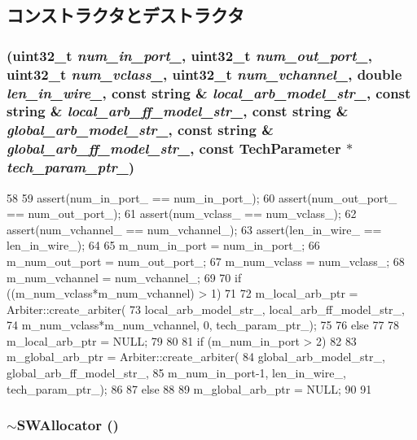 \subsection{コンストラクタとデストラクタ}
\hypertarget{classSWAllocator_a658f3c3ccc639bbbdd0b35825d28d381}{
\subsubsection[{SWAllocator}]{ ({\bf uint32\_\-t} {\em num\_\-in\_\-port\_\-}, \/  {\bf uint32\_\-t} {\em num\_\-out\_\-port\_\-}, \/  {\bf uint32\_\-t} {\em num\_\-vclass\_\-}, \/  {\bf uint32\_\-t} {\em num\_\-vchannel\_\-}, \/  double {\em len\_\-in\_\-wire\_\-}, \/  const string \& {\em local\_\-arb\_\-model\_\-str\_\-}, \/  const string \& {\em local\_\-arb\_\-ff\_\-model\_\-str\_\-}, \/  const string \& {\em global\_\-arb\_\-model\_\-str\_\-}, \/  const string \& {\em global\_\-arb\_\-ff\_\-model\_\-str\_\-}, \/  const {\bf TechParameter} $\ast$ {\em tech\_\-param\_\-ptr\_\-})}}
\label{classSWAllocator_a658f3c3ccc639bbbdd0b35825d28d381}



\begin{DoxyCode}
58 {
59     assert(num_in_port_ == num_in_port_);
60     assert(num_out_port_ == num_out_port_);
61     assert(num_vclass_ == num_vclass_);
62     assert(num_vchannel_ == num_vchannel_);
63     assert(len_in_wire_ == len_in_wire_);
64 
65     m_num_in_port = num_in_port_;
66     m_num_out_port = num_out_port_;
67     m_num_vclass = num_vclass_;
68     m_num_vchannel = num_vchannel_;
69 
70     if ((m_num_vclass*m_num_vchannel) > 1)
71     {
72         m_local_arb_ptr = Arbiter::create_arbiter(
73                 local_arb_model_str_, local_arb_ff_model_str_,
74                 m_num_vclass*m_num_vchannel, 0, tech_param_ptr_);
75     }
76     else
77     {
78         m_local_arb_ptr = NULL;
79     }
80 
81     if (m_num_in_port > 2)
82     {
83         m_global_arb_ptr = Arbiter::create_arbiter(
84                 global_arb_model_str_, global_arb_ff_model_str_,
85                 m_num_in_port-1, len_in_wire_, tech_param_ptr_);
86     }
87     else
88     {
89         m_global_arb_ptr = NULL;
90     }
91 }
\end{DoxyCode}
\hypertarget{classSWAllocator_a0d874d3eda86d00f6c979ad2c87c6414}{
\subsubsection[{$\sim$SWAllocator}]{\setlength{\rightskip}{0pt plus 5cm}$\sim${\bf SWAllocator} ()}}
\label{classSWAllocator_a0d874d3eda86d00f6c979ad2c87c6414}



